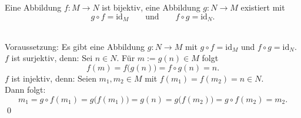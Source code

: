 %
% 
\begin{frame}
	
	Eine Abbildung $f: M\to N$ ist  bijektiv,  
	eine Abbildung $g: N \to M$ existiert mit
	$$
		g\circ f = \text{id}_M
		\qquad
		\text{und}
		\qquad
		f\circ g = \text{id}_N.
	$$  
	
	 \\
	Voraussetzung: Es gibt eine Abbildung $g: N \to M$ mit $g\circ f = \text{id}_M$ und $f\circ g = \text{id}_N$.\\[1mm]
	\pause
	$f$ ist surjektiv, denn: Sei $n\in N$. Für $m:=g(n) \in M$ folgt 
	$$
		f(m) = f\big(g(n)\big) = f\circ g(n) = n.
	$$
	\pause
	$f$ ist injektiv, denn: Seien $m_1, m_2\in M$ mit $f(m_1)=f(m_2) = n \in N$. \\
	\pause
	Dann folgt:
	$$
		m_1 = g\circ f(m_1) =  g\big( f(m_1)\big) =g(n)= g\big( f(m_2)\big) = g\circ f(m_2) = m_2.
	$$
	\qed
	
\end{frame}
%
%

